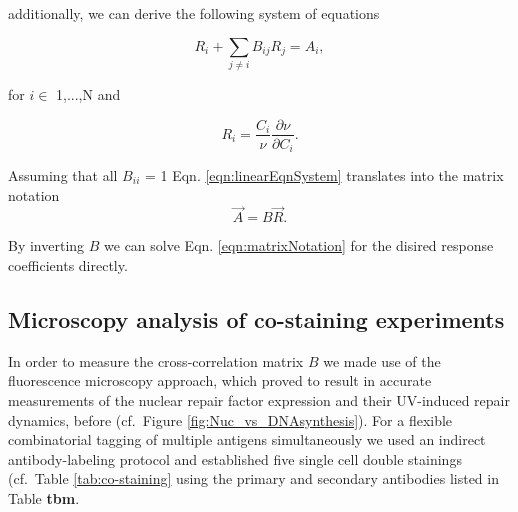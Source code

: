 additionally, we can derive the following system of equations


\begin{equation}
R_i + \sum_{j\neq i} B_{ij}R_j = A_i,
\label{eqn:linearEqnSystem}
\end{equation}

for $i \in$ 1,...,N and

\begin{equation}
R_i = \frac{C_i}{\nu}\frac{\partial \nu}{\partial C_i}.
\label{eqn:responseCoefficientsII}
\end{equation}

Assuming that all $B_{ii}$ = 1 Eqn. \ref{eqn:linearEqnSystem} translates into the matrix notation 
\begin{equation}
\vec{A} = B\vec{R}.
\label{eqn:matrixNotation}
\end{equation}

By inverting $B$ we can solve Eqn. \ref{eqn:matrixNotation} for the disired response coefficients directly. 


\subsection{Microscopy analysis of co-staining experiments}

In order to measure the cross-correlation matrix $B$ we made use of the fluorescence microscopy approach, which proved to result in accurate measurements of the nuclear repair factor expression and their UV-induced repair dynamics, before (cf.\ Figure \ref{fig:Nuc_vs_DNAsynthesis}). For a flexible combinatorial tagging of multiple antigens simultaneously we used an indirect antibody-labeling protocol and established five single cell double stainings (cf.\ Table \ref{tab:co-staining} using the primary and secondary antibodies listed in Table \textbf{tbm}. 


